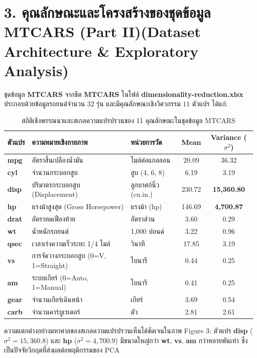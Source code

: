 \documentclass[12pt,a4paper]{article}
\newcommand{\codevar}[1]{\textcolor{codeaccent}{\textbf{#1}}}
\begin{document}
\clearpage
\section*{3. คุณลักษณะและโครงสร้างของชุดข้อมูล MTCARS (Part II)\newline \large(Dataset Architecture \& Exploratory Analysis)}

ชุดข้อมูล \textbf{MTCARS} จากชีต \codevar{MTCARS} ในไฟล์ \codevar{dimensionality-reduction.xlsx} ประกอบด้วยข้อมูลรถยนต์จำนวน $32$ รุ่น และมีคุณลักษณะเชิงวิศวกรรม $11$ ตัวแปร ได้แก่:
\begin{table}[H]
\centering
\small
\begin{tabular}{lllcc}
\toprule
\textbf{ตัวแปร} & \textbf{ความหมายเชิงกายภาพ} & \textbf{หน่วยการวัด} & \textbf{Mean} & \textbf{Variance ($\sigma^2$)} \\
\midrule
\codevar{mpg}  & อัตราสิ้นเปลืองน้ำมัน & ไมล์ต่อแกลลอน & 20.09 & 36.32 \\
\codevar{cyl}  & จำนวนกระบอกสูบ & สูบ (4, 6, 8) & 6.19 & 3.19 \\
\codevar{disp} & ปริมาตรกระบอกสูบ (Displacement) & ลูกบาศก์นิ้ว (cu.in.) & 230.72 & \textbf{15,360.80} \\
\codevar{hp}   & แรงม้าสูงสุด (Gross Horsepower) & แรงม้า (hp) & 146.69 & \textbf{4,700.87} \\
\codevar{drat} & อัตราทดเฟืองท้าย & อัตราส่วน & 3.60 & 0.29 \\
\codevar{wt}   & น้ำหนักรถยนต์ & 1,000 ปอนด์ & 3.22 & 0.96 \\
\codevar{qsec} & เวลาเร่งความเร็วระยะ 1/4 ไมล์ & วินาที & 17.85 & 3.19 \\
\codevar{vs}   & การจัดวางกระบอกสูบ (0=V, 1=Straight) & ไบนารี & 0.44 & 0.25 \\
\codevar{am}   & ระบบเกียร์ (0=Auto, 1=Manual) & ไบนารี & 0.41 & 0.25 \\
\codevar{gear} & จำนวนเกียร์เดินหน้า & เกียร์ & 3.69 & 0.54 \\
\codevar{carb} & จำนวนคาร์บูเรเตอร์ & ตัว & 2.81 & 2.61 \\
\bottomrule
\end{tabular}
\caption{สถิติเชิงพรรณนาและสเกลความแปรปรวนของ 11 คุณลักษณะในชุดข้อมูล MTCARS}
\end{table}

ความแตกต่างอย่างมหาศาลของสเกลความแปรปรวนเห็นได้ชัดเจนในภาพ Figure 3: ตัวแปร \codevar{disp} ($\sigma^2 = 15,360.8$) และ \codevar{hp} ($\sigma^2 = 4,700.9$) มีขนาดใหญ่กว่า \codevar{wt}, \codevar{vs}, \codevar{am} กว่าหลายพันเท่า ซึ่งเป็นปัจจัยวิกฤตที่ส่งผลต่อพฤติกรรมของ PCA
\end{document}
